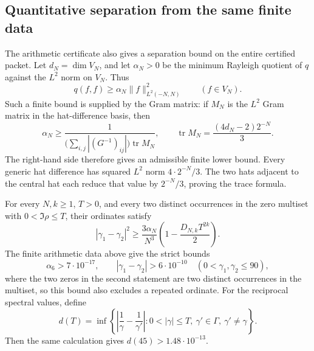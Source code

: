 \subsection{Quantitative separation from the same finite data}
\label{sec:fd-arithmetic-separation}

The arithmetic certificate also gives a separation bound on the entire
certified packet. Let \(d_N=\dim V_N\), and let
\(\alpha_N>0\) be the minimum Rayleigh quotient of \(q\) against
the \(L^2\) norm on \(V_N\). Thus
\[
 q(f,f)\ge\alpha_N\|f\|_{L^2(-N,N)}^2\qquad(f\in V_N).
\]
Such a finite bound is supplied by the Gram matrix: if \(M_N\) is the
\(L^2\) Gram matrix in the hat-difference basis, then
\[
 \alpha_N\ge
 \frac{1}{\bigl(\sum_{i,j}|(G^{-1})_{ij}|\bigr)
                 \operatorname{tr}M_N},\qquad
 \operatorname{tr}M_N=\frac{(4d_N-2)2^{-N}}3.
\]
The right-hand side therefore gives an admissible finite lower bound.
Every generic hat difference has squared \(L^2\) norm
\(4\cdot2^{-N}/3\).
The two hats adjacent to the central hat each reduce that value by
\(2^{-N}/3\), proving the trace formula.

\begin{proposition}
\label{prop:fd-arithmetic-separation}
For every \(N,k\ge1\), \(T>0\), and every two distinct occurrences
in the zero multiset with \(0<\Im\rho\le T\), their
ordinates satisfy
\[
 |\gamma_1-\gamma_2|^2\ge
 \frac{3\alpha_N}{N^3}
       \left(1-\frac{D_{N,k}T^{2k}}2\right).
 \label{eq:fd-separation-bound}
\]
The finite arithmetic data above give the strict bounds
\[
 \alpha_6>7\cdot10^{-17},\qquad
 |\gamma_1-\gamma_2|>6\cdot10^{-10}
       \quad(0<\gamma_1,\gamma_2\le90),
\]
where the two zeros in the second statement are two distinct
occurrences in the multiset, so this bound also excludes a repeated ordinate.
For the reciprocal spectral values, define
\[
 d(T)=\inf\left\{
  \left|\frac1\gamma-\frac1{\gamma'}\right|:
  0<|\gamma|\le T,\ \gamma'\in\Gamma,\ \gamma'\ne\gamma
 \right\}.
\]
Then the same calculation gives \(d(45)>1.48\cdot10^{-13}\).
\end{proposition}


